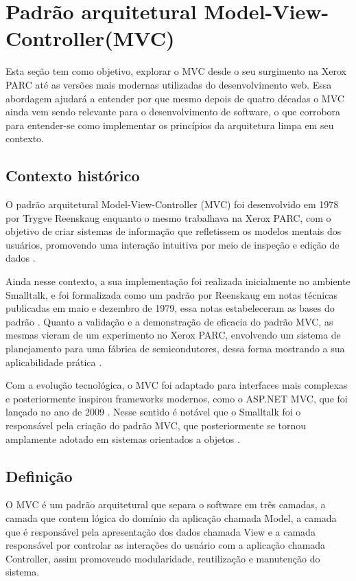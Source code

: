\section{Padrão arquitetural Model-View-Controller(MVC)}
    \par Esta seção tem como objetivo, explorar o MVC desde o seu surgimento na Xerox PARC até as versões mais modernas utilizadas do desenvolvimento web. Essa abordagem ajudará a entender por que mesmo depois de quatro décadas o MVC ainda vem sendo relevante para o desenvolvimento de software, o que corrobora para entender-se como implementar os princípios da arquitetura limpa em seu contexto.
    
    \subsection{Contexto histórico}
    
        \par O padrão arquitetural Model-View-Controller (MVC) foi desenvolvido em 1978 por Trygve Reenskaug enquanto o mesmo trabalhava na Xerox PARC, com o objetivo de criar sistemas de informação que refletissem os modelos mentais dos usuários, promovendo uma interação intuitiva por meio de inspeção e edição de dados \cite[p.~1]{artigo:reenskaug:2003}. 
        
        \par Ainda nesse contexto, a sua implementação foi realizada inicialmente no ambiente Smalltalk, e foi formalizada como um padrão por Reenskaug em notas técnicas publicadas em maio e dezembro de 1979, essa notas estabeleceram as bases do padrão \cite{artigo:reenskaug:1979}. Quanto a validação e a demonstração de eficacia do padrão MVC, as mesmas vieram de um experimento no Xerox PARC, envolvendo um sistema de planejamento para uma fábrica de semicondutores, dessa forma mostrando a sua aplicabilidade prática \cite{artigo:reenskaug:2003}.
        
        \par Com a evolução tecnológica, o MVC foi adaptado para interfaces mais complexas e posteriormente inspirou frameworks modernos, como o ASP.NET MVC, que foi lançado no ano de 2009 \cite{artigo:deacon:2009}. Nesse sentido é notável  que o Smalltalk foi o responsável pela criação do padrão MVC, que posteriormente se tornou amplamente adotado em sistemas orientados a objetos \cite{artigo:deacon:2009}.
        
    \subsection{Definição}
        \par O MVC é um padrão arquitetural que separa o software em três camadas, a camada que contem lógica do domínio da aplicação chamada Model, a camada que é responsável pela apresentação dos dados chamada View e a camada responsável por controlar as interações do usuário com a aplicação chamada Controller, assim promovendo modularidade, reutilização e manutenção do sistema\cite{artigo:reenskaug:2003}.

